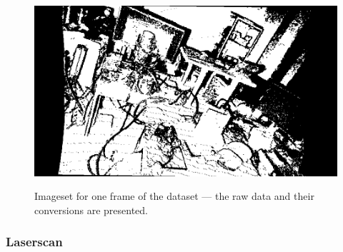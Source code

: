 \begin{figure}[H]
\begin{floatrow}
{    \includegraphics[width=0.5\linewidth]{chapter05/img/office/bearing_0024.png}%
    }
    {\caption{Imageset for one frame of the dataset --- the raw data and their conversions are presented.}\label{fig:office_data}}
\end{floatrow}
\end{figure}

\subsubsection{Laserscan}

